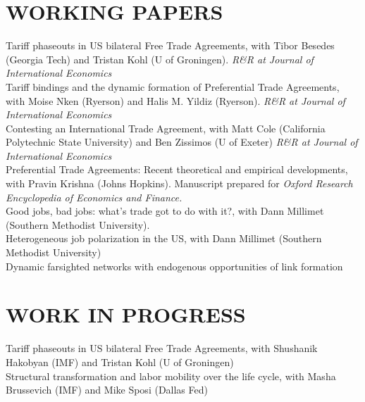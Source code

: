 \documentclass[11pt]{res}
\begin{document}
\begin{resume}
\section{WORKING PAPERS}\vspace{1.5mm}
Tariff phaseouts in US bilateral Free Trade Agreements, with Tibor Besedes (Georgia Tech) and Tristan Kohl (U of Groningen). \emph{R\&R at Journal of International Economics}\vspace{1.5mm}\\
{Tariff bindings and the dynamic formation of Preferential Trade Agreements}, with Moise Nken (Ryerson) and Halis M. Yildiz (Ryerson). \emph{R\&R at Journal of International Economics}\vspace{1.5mm}\\
{Contesting an International Trade Agreement}, with Matt Cole (California Polytechnic State University) and Ben Zissimos (U of Exeter) \emph{R\&R at Journal of International Economics}\vspace{1.5mm}\\
{Preferential Trade Agreements: Recent theoretical and empirical developments}, with Pravin Krishna (Johns Hopkins). Manuscript prepared for \emph{Oxford Research Encyclopedia of Economics and Finance.}\vspace{1.5mm}\\
{Good jobs, bad jobs: what's trade got to do with it?}, with Dann Millimet (Southern Methodist University).\vspace{1.5mm}\\
{Heterogeneous job polarization in the US}, with Dann Millimet (Southern Methodist University)\vspace{1.5mm}\\
{Dynamic farsighted networks with endogenous opportunities of link formation}

\section{WORK IN PROGRESS}\vspace{1.5mm}
Tariff phaseouts in US bilateral Free Trade Agreements, with Shushanik Hakobyan (IMF) and Tristan Kohl (U of Groningen)\vspace{1.5mm}\\
Structural transformation and labor mobility over the life cycle, with Masha Brussevich (IMF) and Mike Sposi (Dallas Fed)\vspace{1.5mm}\\



\end{resume}
\end{document}
